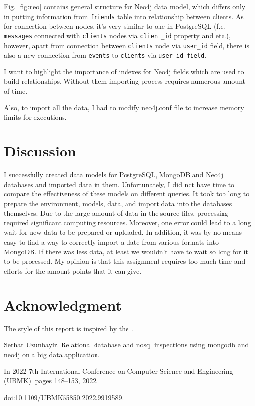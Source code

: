 \documentclass[conference]{IEEEtran}
\newcommand{\code}[1]{\colorbox{codegray}{\texttt{#1}}}
\begin{document}
 Fig. \ref{fig:neo} contains general structure for Neo4j data model, which differs only in putting information from \code{friends} table into relationship between clients. As for connection between nodes, it's very similar to one in PostgreSQL (f.e. \code{messages} connected with \code{clients} nodes via \code{client\_id} property and etc.), however, apart from connection between \code{clients} node via \code{user\_id} field, there is also a new connection from \code{events} to \code{clients} via \code{user\_id field}.

 I want to highlight the importance of indexes for Neo4j fields which are used to build relationships. Without them importing process requires numerous amount of time.

 Also, to import all the data, I had to modify neo4j.conf file to increase memory limits for executions.

\section{Discussion}
I successfully created data models for PostgreSQL, MongoDB and Neo4j databases and imported data in them.
Unfortunately, I did not have time to compare the effectiveness of these models on different queries. It took too long to prepare the environment, models, data, and import data into the databases themselves. Due to the large amount of data in the source files, processing required significant computing resources. Moreover, one error could lead to a long wait for new data to be prepared or uploaded. In addition, it was by no means easy to find a way to correctly import a date from various formats into MongoDB. If there was less data, at least we wouldn't have to wait so long for it to be processed. My opinion is that this assignment requires too much time and efforts for the amount points that it can give.

\section*{Acknowledgment}

The style of this report is inspired by the~\cite{uzunbayir}.

\begin{thebibliography}{00}

     Serhat Uzunbayir. Relational database and nosql inspections using mongodb and neo4j on a big data application.

    In 2022 7th International Conference on Computer Science and Engineering (UBMK), pages 148--153, 2022.

    doi:10.1109/UBMK55850.2022.9919589.

\end{thebibliography}
\end{document}
